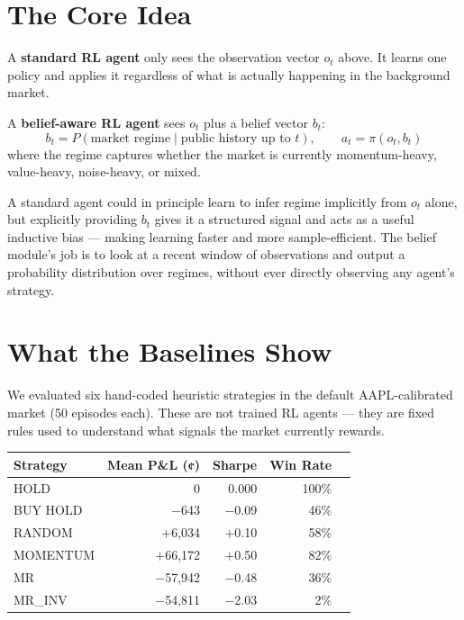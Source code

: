 \documentclass[11pt]{article}
\begin{document}
\section{The Core Idea}

A \textbf{standard RL agent} only sees the observation vector $o_t$ above. It learns one policy and applies it regardless of what is actually happening in the background market.

A \textbf{belief-aware RL agent} sees $o_t$ plus a belief vector $b_t$:
\[
b_t = P(\text{market regime} \mid \text{public history up to } t), \qquad a_t = \pi(o_t, b_t)
\]
where the regime captures whether the market is currently momentum-heavy, value-heavy, noise-heavy, or mixed.

A standard agent could in principle learn to infer regime implicitly from $o_t$ alone, but explicitly providing $b_t$ gives it a structured signal and acts as a useful inductive bias --- making learning faster and more sample-efficient. The belief module's job is to look at a recent window of observations and output a probability distribution over regimes, without ever directly observing any agent's strategy.

\section{What the Baselines Show}

We evaluated six hand-coded heuristic strategies in the default AAPL-calibrated market (50 episodes each). These are not trained RL agents --- they are fixed rules used to understand what signals the market currently rewards.

\begin{center}
\begin{tabular}{lrrrr}
\toprule
\textbf{Strategy} & \textbf{Mean P\&L (¢)} & \textbf{Sharpe} & \textbf{Win Rate} \\
\midrule
HOLD        & 0       & 0.000  & 100\% \\
BUY HOLD    & $-$643  & $-$0.09 & 46\% \\
RANDOM      & $+$6,034  & $+$0.10 & 58\% \\
MOMENTUM    & $+$66,172 & $+$0.50 & 82\% \\
MR          & $-$57,942 & $-$0.48 & 36\% \\
MR\_INV     & $-$54,811 & $-$2.03 & 2\%  \\
\bottomrule
\end{tabular}
\end{center}
\end{document}
